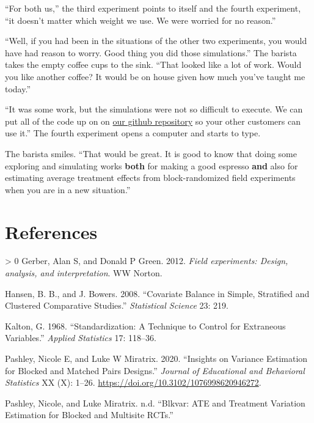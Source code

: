 \documentclass[
]{article}
\newlength{\cslhangindent}
\newenvironment{CSLReferences}[3] %
 {%
  \setlength{\parindent}{0pt}
  \ifodd #1 \everypar{\setlength{\hangindent}{\cslhangindent}}\ignorespaces\fi
  \ifnum #2 > 0
  \setlength{\parskip}{#2\baselineskip}
  \fi
 }%
 {}
\begin{document}
``For both us,'' the third experiment points to itself and the fourth experiment, ``it doesn't matter which weight we use. We were worried for no reason.''

``Well, if you had been in the situations of the other two experiments, you would have had reason to worry. Good thing you did those simulations.'' The barista takes the empty coffee cups to the sink. ``That looked like a lot of work. Would you like another coffee? It would be on house given how much you've taught me today.''

``It was some work, but the simulations were not so difficult to execute. We can put all of the code up on on \href{https://github.com/egap/standards_discussions/block_rand}{our github repository} so your other customers can use it.'' The fourth experiment opens a computer and starts to type.

The barista smiles. ``That would be great. It is good to know that doing some exploring and simulating works \textbf{both} for making a good espresso \textbf{and} also for estimating average treatment effects from block-randomized field experiments when you are in a new situation.''

\hypertarget{references}{%
\section*{References}\label{references}}

\hypertarget{refs}{}
\begin{CSLReferences}{1}{0}
\leavevmode\hypertarget{ref-gerber2012field}{}%
Gerber, Alan S, and Donald P Green. 2012. \emph{{Field experiments: Design, analysis, and interpretation}}. WW Norton.

\leavevmode\hypertarget{ref-hansen2008cbs}{}%
Hansen, B. B., and J. Bowers. 2008. {``Covariate Balance in Simple, Stratified and Clustered Comparative Studies.''} \emph{Statistical Science} 23: 219.

\leavevmode\hypertarget{ref-kalton1968}{}%
Kalton, G. 1968. {``Standardization: {A} Technique to Control for Extraneous Variables.''} \emph{Applied Statistics} 17: 118--36.

\leavevmode\hypertarget{ref-pashley2020blocked}{}%
Pashley, Nicole E, and Luke W Miratrix. 2020. {``Insights on Variance Estimation for Blocked and Matched Pairs Designs.''} \emph{Journal of Educational and Behavioral Statistics} XX (X): 1--26. \url{https://doi.org/10.3102/1076998620946272}.

\leavevmode\hypertarget{ref-pashley2020blkvar}{}%
Pashley, Nicole, and Luke Miratrix. n.d. {``Blkvar: ATE and Treatment Variation Estimation for Blocked and Multisite RCTs.''}

\end{CSLReferences}
\end{document}
